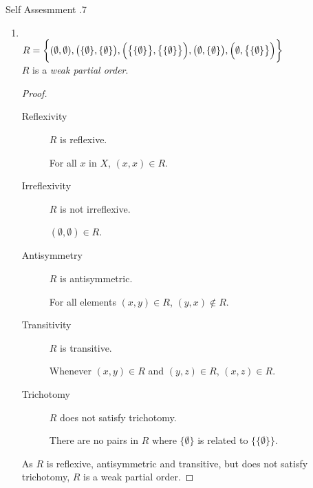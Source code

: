 \documentclass[\main/notes.tex]{subfiles}
\begin{document}
\begin{exercise}{Self Assesmment \thechapter.7}
\begin{enumerate}
\begin{enumerate}[label=(\alph*)]
								\tcbbreak
								\item {}\\
									$R = \biggl\{(\emptyset, \emptyset), \bigl(\{\emptyset\}, \{\emptyset\}\bigr), \Bigl(\bigl\{\{\emptyset \}\bigr\}, \bigl\{\{\emptyset\}\bigr\}\Bigr), \bigl(\emptyset, \{\emptyset\}\bigr), \Bigl(\emptyset, \bigl\{\{\emptyset\}\bigr\}\Bigr)\biggr\}$\\
									$R$ is a \emph{weak partial order}.
									\begin{proof}
										$ $
										\begin{description}
											\item[Reflexivity] $R$ is reflexive.
												\begin{subproof}
													For all $x$ in $X$, $(x, x) \in R$.
												\end{subproof}
											\item[Irreflexivity] $R$ is not irreflexive.
												\begin{subproof}[Counterexample]
													$(\emptyset, \emptyset) \in R$.
												\end{subproof}
											\item[Antisymmetry] $R$ is antisymmetric.
												\begin{subproof}
													For all elements $(x, y) \in R$, $(y, x) \notin R$.
												\end{subproof}
											\item[Transitivity] $R$ is transitive.
												\begin{subproof}
													Whenever $(x, y) \in R$ and $(y, z) \in R$, $(x, z) \in R$.
												\end{subproof}
											\item[Trichotomy] $R$ does not satisfy trichotomy.
												\begin{subproof}[Counterexample]
													There are no pairs in $R$ where $\{\emptyset\}$ is related to $\bigl\{\{\emptyset\}\bigr\}$.
												\end{subproof}
										\end{description}
										As $R$ is reflexive, antisymmetric and transitive, but does not satisfy trichotomy, $R$ is a weak partial order.
									\end{proof}
							\end{enumerate}

\end{enumerate}
\end{exercise}
\end{document}
